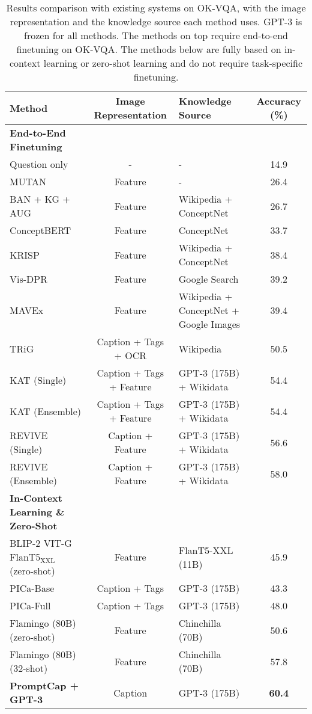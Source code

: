 \documentclass[10pt,twocolumn,letterpaper]{article}
\begin{document}
 

\begin{table*}[h]
\small
\centering
\caption{
\label{tab:okvqa}
Results comparison with existing systems on OK-VQA, with the image representation and the knowledge source each method uses.
GPT-3 is frozen for all methods.  The methods on top require end-to-end finetuning on OK-VQA. The methods below are fully based on in-context learning or zero-shot learning and do not require task-specific finetuning.
}
\begin{tabular}{l|c|l|c}
\toprule[1.2pt]
Method & Image Representation & Knowledge Source & Accuracy (\%)\\
\midrule
\textbf{End-to-End Finetuning}\\
Question only \cite{marino2019ok} & - & - & 14.9 \\
MUTAN \cite{marino2019okvqa} & Feature & - & 26.4 \\
BAN + KG + AUG \cite{Li2020BoostingVQ} & Feature & Wikipedia + ConceptNet & 26.7 \\
ConceptBERT \cite{garderes2020conceptbert} &  Feature & ConceptNet & 33.7\\
KRISP \cite{marino2021krisp} &  Feature & Wikipedia + ConceptNet & 38.4 \\
Vis-DPR \cite{luo2021weakly}  &  Feature  & Google Search  & 39.2 \\
MAVEx \cite{wu2022multi} & Feature & Wikipedia + ConceptNet + Google Images & 39.4  \\
TRiG \cite{Gao_2022_CVPR} & Caption + Tags + OCR & Wikipedia & 50.5 \\
KAT (Single) \cite{gui2022kat} & Caption + Tags + Feature & GPT-3 (175B) + Wikidata & 54.4   \\
KAT (Ensemble) \cite{gui2022kat} & Caption + Tags + Feature & GPT-3 (175B) + Wikidata & 54.4   \\
REVIVE (Single) \cite{Lin2022REVIVERV} & Caption + Feature & GPT-3 (175B) + Wikidata & 56.6 \\
REVIVE (Ensemble) \cite{Lin2022REVIVERV} & Caption + Feature & GPT-3 (175B) + Wikidata & 58.0 \\
\midrule
\textbf{In-Context Learning \& Zero-Shot} \\
BLIP-2 VIT-G FlanT5$_\text{XXL}$ \cite{Li2023BLIP2BL} (zero-shot) & Feature & FlanT5-XXL (11B) & 45.9 \\
PICa-Base \cite{yang2022empirical} & Caption + Tags &  GPT-3 (175B) & 43.3   \\
PICa-Full \cite{yang2022empirical} & Caption + Tags &  GPT-3 (175B) & 48.0   \\
Flamingo (80B) \cite{alayrac2022flamingo} (zero-shot) & Feature & Chinchilla (70B) & 50.6 \\
Flamingo (80B) \cite{alayrac2022flamingo} (32-shot) & Feature &  Chinchilla (70B) & 57.8 \\ 
\textbf{PromptCap + GPT-3} & Caption  & GPT-3 (175B) & \textbf{60.4} \\
\bottomrule[1.2pt]
\end{tabular}


\end{table*}
\end{document}
